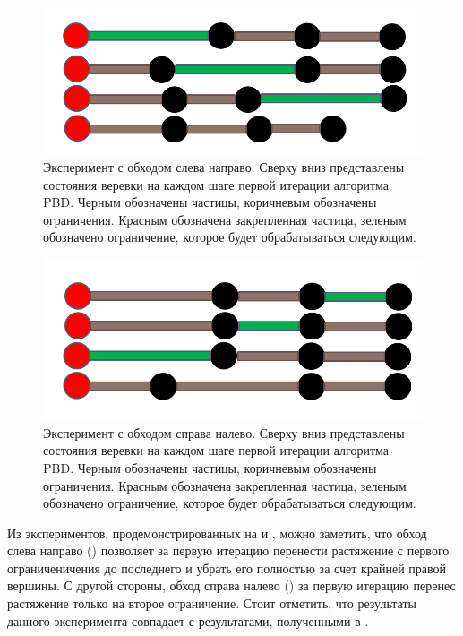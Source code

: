 	\begin{figure}[ht!] 
		\center
		\includegraphics [scale=0.5] {my_folder/images//experiment_forward.png}
		\caption{Эксперимент с обходом слева направо. Сверху вниз представлены состояния веревки на каждом шаге первой итерации алгоритма PBD. Черным обозначены частицы, коричневым обозначены ограничения. Красным обозначена закрепленная частица, зеленым обозначено ограничение, которое будет обрабатываться следующим.}
		\label{fig:experiment-forward}  
	\end{figure}

	\begin{figure}[ht!] 
		\center
		\includegraphics [scale=0.5] {my_folder/images//experiment_backward.png}
		\caption{Эксперимент с обходом справа налево. Сверху вниз представлены состояния веревки на каждом шаге первой итерации алгоритма PBD. Черным обозначены частицы, коричневым обозначены ограничения. Красным обозначена закрепленная частица, зеленым обозначено ограничение, которое будет обрабатываться следующим.}
		\label{fig:experiment-backward}  
	\end{figure}	
	
	Из экспериментов, продемонстрированных на  и , можно заметить, что обход слева направо () позволяет за первую итерацию перенести растяжение с первого ограниченичения до последнего и убрать его полностью за счет крайней правой вершины. С другой стороны, обход справа налево () за первую итерацию перенес растяжение только на второе ограничение. Стоит отметить, что результаты данного эксперимента совпадает с результатами, полученными в \cite{gu2017constraint}.
	
